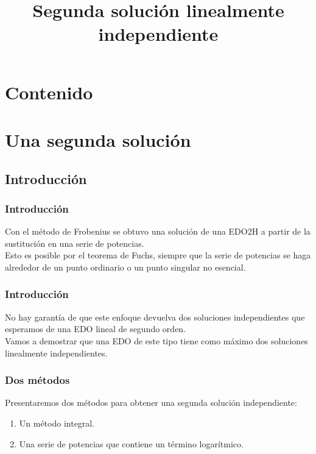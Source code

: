 \documentclass[12pt]{beamer}
\title{\large{Segunda solución linealmente independiente}}
\begin{document}
\maketitle
\fontsize{14}{14}\selectfont
{}

\section*{Contenido}

\section{Una segunda solución}
\subsection{Introducción}

\begin{frame}
\frametitle{Introducción}
Con el método de Frobenius se obtuvo una solución de una EDO2H a partir de la sustitución en una serie de potencias.
\\
\bigskip
\pause
Esto es posible por el teorema de Fuchs, siempre que la serie de potencias se haga alrededor de un punto ordinario o un punto singular no esencial.
\end{frame}
\begin{frame}
\frametitle{Introducción}
No hay garantía de que este enfoque devuelva dos soluciones independientes que esperamos de una EDO lineal de segundo orden.
\\
\bigskip
Vamos a demostrar que una EDO de este tipo tiene como máximo dos soluciones linealmente independientes. 
\end{frame}
\begin{frame}
\frametitle{Dos métodos }
Presentaremos dos métodos para obtener una segunda solución independiente:
\begin{enumerate}[<+->]
\item Un método integral.
\item Una serie de potencias que contiene un término logarítmico.
\end{enumerate}
\end{frame}
\end{document}
